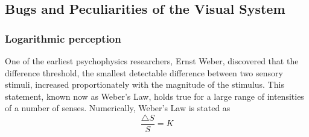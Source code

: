 \documentclass[11pt]{isuthesis}\usepackage[]{graphicx}\usepackage[]{color}
\begin{document}
\subsection{Bugs and Peculiarities of the Visual System}\label{visualbugs}
\subsubsection{Logarithmic perception}\label{logarithmicperception} One of the earliest psychophysics researchers, Ernst Weber, discovered that the difference threshold, the smallest detectable difference between two sensory stimuli, increased proportionately with the magnitude of the stimulus. This statement, known now as Weber's Law, holds true for a large range of intensities of a number of senses. Numerically, Weber's Law is stated as 
\begin{equation}\label{weberlaw}
\frac{\triangle S}{S} = K
\end{equation}
\end{document}
